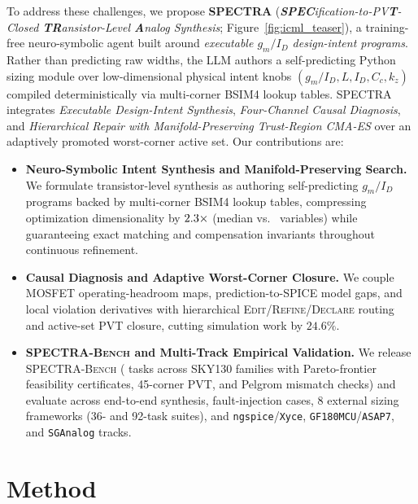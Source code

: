 \documentclass{article}
\theoremstyle{plain}
\begin{document}
To address these challenges, we propose \textbf{\textsc{SPECTRA}} (\emph{\textbf{SPEC}ification-to-PV\textbf{T}-Closed \textbf{TR}ansistor-Level \textbf{A}nalog Synthesis}; Figure~\ref{fig:icml_teaser}), a training-free neuro-symbolic agent built around \emph{executable $g_m/I_D$ design-intent programs}. Rather than predicting raw widths, the LLM authors a self-predicting Python sizing module over low-dimensional physical intent knobs $(g_m/I_D, L, I_D, C_c, k_z)$ compiled deterministically via multi-corner BSIM4 lookup tables. \textsc{SPECTRA} integrates \emph{Executable Design-Intent Synthesis}, \emph{Four-Channel Causal Diagnosis}, and \emph{Hierarchical Repair with Manifold-Preserving Trust-Region CMA-ES} over an adaptively promoted worst-corner active set. Our contributions are:
\begin{itemize}[leftmargin=*, topsep=2pt, itemsep=1.5pt]
\item \textbf{Neuro-Symbolic Intent Synthesis and Manifold-Preserving Search.} We formulate transistor-level synthesis as authoring self-predicting $g_m/I_D$ programs backed by multi-corner BSIM4 lookup tables, compressing optimization dimensionality by $2.3{}\times$ (median \IntentVars{} vs.\ \RawVars{} variables) while guaranteeing exact matching and compensation invariants throughout continuous refinement.
\item \textbf{Causal Diagnosis and Adaptive Worst-Corner Closure.} We couple MOSFET operating-headroom maps, prediction-to-SPICE model gaps, and local violation derivatives with hierarchical \textsc{Edit}/\textsc{Refine}/\textsc{Declare} routing and active-set PVT closure, cutting simulation work by $24.6\%$.
\item \textbf{\textsc{SPECTRA-Bench} and Multi-Track Empirical Validation.} We release \textsc{SPECTRA-Bench} (\NTasksTotal{} tasks across \NPrimaryFamilies{} SKY130 families with Pareto-frontier feasibility certificates, 45-corner PVT, and Pelgrom mismatch checks) and evaluate across end-to-end synthesis, \FaultN{} fault-injection cases, 8 external sizing frameworks (36- and 92-task suites), and \texttt{ngspice}/\allowbreak\texttt{Xyce}, \texttt{GF180MCU}/\allowbreak\texttt{ASAP7}, and \texttt{SGAnalog} tracks.
\end{itemize}

\section{Method}
\label{sec:method}
\end{document}
